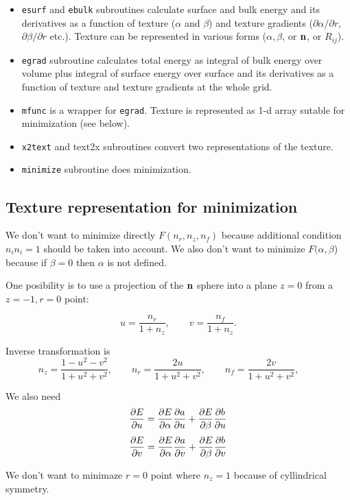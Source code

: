 \documentclass[a4paper]{article}
\begin{document}
\begin{itemize}
\item {\tt esurf} and {\tt ebulk} subroutines calculate surface and
bulk energy and its derivatives as a function of texture ($\alpha$ and
$\beta$) and texture gradients ($\partial\alpha/\partial r$,
$\partial\beta/\partial r$ etc.). Texture can be represented in various
forms ($\alpha, \beta$, or $\bf n$, or $R_{ij}$).

\item {\tt egrad} subroutine calculates total energy as integral of bulk energy over volume
plus integral of surface energy over surface and its derivatives as a
function of texture and texture gradients at the whole grid.

\item {\tt mfunc} is a wrapper for {\tt egrad}. Texture is represented
as 1-d array sutable for minimization (see below).

\item {\tt x2text} and {text2x} subroutines convert two representations of the texture.

\item {\tt minimize} subroutine does minimization.
\end{itemize}


\subsection*{Texture representation for minimization}

We don't want to minimize directly $F(n_r, n_z, n_f)$ because additional
condition $n_i n_i = 1$ should be taken into account. We also don't want
to minimize $F(\alpha, \beta$) because if $\beta=0$ then $\alpha$
is not defined.

One posibility is to use a projection of the $\bf n$ sphere into a plane
$z=0$ from a $z=-1, r=0$ point:

$$
u=\frac{n_r}{1+n_z}, \qquad  v=\frac{n_f}{1+n_z}.
$$

Inverse transformation is
$$
n_z = \frac{1-u^2-v^2}{1+u^2+v^2},\qquad
n_r = \frac{2u}{1+u^2+v^2},\qquad
n_f = \frac{2v}{1+u^2+v^2},\qquad
$$

We also need
$$
\frac{\partial E}{\partial u} = \frac{\partial E}{\partial \alpha}\frac{\partial a}{\partial u} + \frac{\partial E}{\partial \beta}\frac{\partial b}{\partial u}
$$
$$
\frac{\partial E}{\partial v} = \frac{\partial E}{\partial \alpha}\frac{\partial a}{\partial v} + \frac{\partial E}{\partial \beta}\frac{\partial b}{\partial v}
$$

We don't want to minimaze $r=0$ point where $n_z=1$ because of cyllindrical symmetry.
\end{document}
